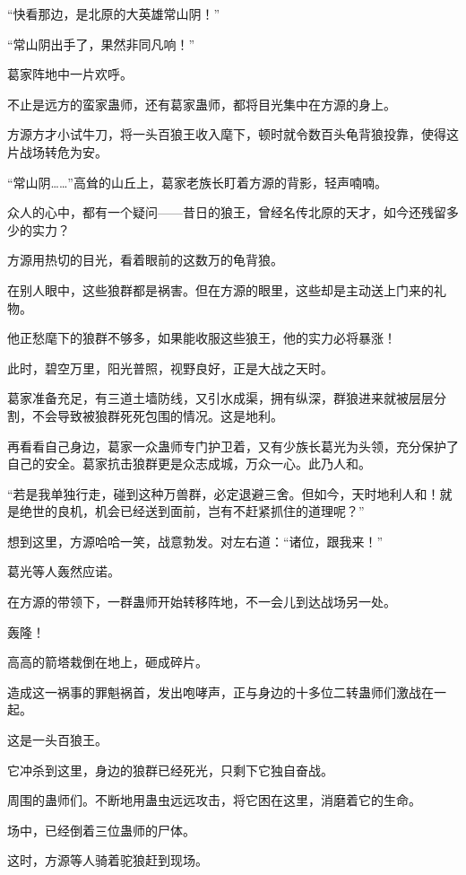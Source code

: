 
\begin{this_body}

“快看那边，是北原的大英雄常山阴！”

“常山阴出手了，果然非同凡响！”

葛家阵地中一片欢呼。

不止是远方的蛮家蛊师，还有葛家蛊师，都将目光集中在方源的身上。

方源方才小试牛刀，将一头百狼王收入麾下，顿时就令数百头龟背狼投靠，使得这片战场转危为安。

“常山阴……”高耸的山丘上，葛家老族长盯着方源的背影，轻声喃喃。

众人的心中，都有一个疑问——昔日的狼王，曾经名传北原的天才，如今还残留多少的实力？

方源用热切的目光，看着眼前的这数万的龟背狼。

在别人眼中，这些狼群都是祸害。但在方源的眼里，这些却是主动送上门来的礼物。

他正愁麾下的狼群不够多，如果能收服这些狼王，他的实力必将暴涨！

此时，碧空万里，阳光普照，视野良好，正是大战之天时。

葛家准备充足，有三道土墙防线，又引水成渠，拥有纵深，群狼进来就被层层分割，不会导致被狼群死死包围的情况。这是地利。

再看看自己身边，葛家一众蛊师专门护卫着，又有少族长葛光为头领，充分保护了自己的安全。葛家抗击狼群更是众志成城，万众一心。此乃人和。

“若是我单独行走，碰到这种万兽群，必定退避三舍。但如今，天时地利人和！就是绝世的良机，机会已经送到面前，岂有不赶紧抓住的道理呢？”

想到这里，方源哈哈一笑，战意勃发。对左右道：“诸位，跟我来！”

葛光等人轰然应诺。

在方源的带领下，一群蛊师开始转移阵地，不一会儿到达战场另一处。

轰隆！

高高的箭塔栽倒在地上，砸成碎片。

造成这一祸事的罪魁祸首，发出咆哮声，正与身边的十多位二转蛊师们激战在一起。

这是一头百狼王。

它冲杀到这里，身边的狼群已经死光，只剩下它独自奋战。

周围的蛊师们。不断地用蛊虫远远攻击，将它困在这里，消磨着它的生命。

场中，已经倒着三位蛊师的尸体。

这时，方源等人骑着驼狼赶到现场。


\end{this_body}
